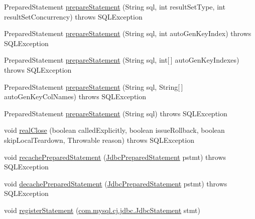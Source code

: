 \begin{DoxyCompactItemize}
\item 
Prepared\+Statement \mbox{\hyperlink{classcom_1_1mysql_1_1cj_1_1jdbc_1_1ha_1_1_multi_host_my_s_q_l_connection_a37f91cfbb410515eae656f2749714a96}{prepare\+Statement}} (String sql, int result\+Set\+Type, int result\+Set\+Concurrency)  throws S\+Q\+L\+Exception 
\item 
Prepared\+Statement \mbox{\hyperlink{classcom_1_1mysql_1_1cj_1_1jdbc_1_1ha_1_1_multi_host_my_s_q_l_connection_a5e08398e0f2ff6b7450f3d2200d250b4}{prepare\+Statement}} (String sql, int auto\+Gen\+Key\+Index)  throws S\+Q\+L\+Exception 
\item 
Prepared\+Statement \mbox{\hyperlink{classcom_1_1mysql_1_1cj_1_1jdbc_1_1ha_1_1_multi_host_my_s_q_l_connection_ae8271152c79bc6964317cf0ed1568e90}{prepare\+Statement}} (String sql, int\mbox{[}$\,$\mbox{]} auto\+Gen\+Key\+Indexes)  throws S\+Q\+L\+Exception 
\item 
Prepared\+Statement \mbox{\hyperlink{classcom_1_1mysql_1_1cj_1_1jdbc_1_1ha_1_1_multi_host_my_s_q_l_connection_a7d26af1cd0ebb70f66bb6e2324f4bd45}{prepare\+Statement}} (String sql, String\mbox{[}$\,$\mbox{]} auto\+Gen\+Key\+Col\+Names)  throws S\+Q\+L\+Exception 
\item 
Prepared\+Statement \mbox{\hyperlink{classcom_1_1mysql_1_1cj_1_1jdbc_1_1ha_1_1_multi_host_my_s_q_l_connection_afa2f8981f698b2b0ba146da7672f890a}{prepare\+Statement}} (String sql)  throws S\+Q\+L\+Exception 
\item 
void \mbox{\hyperlink{classcom_1_1mysql_1_1cj_1_1jdbc_1_1ha_1_1_multi_host_my_s_q_l_connection_adbed19e958ded6aa76e2e1cd5c6e51be}{real\+Close}} (boolean called\+Explicitly, boolean issue\+Rollback, boolean skip\+Local\+Teardown, Throwable reason)  throws S\+Q\+L\+Exception 
\item 
void \mbox{\hyperlink{classcom_1_1mysql_1_1cj_1_1jdbc_1_1ha_1_1_multi_host_my_s_q_l_connection_a861ff794887b4e5d0cd1ae1d2477bd9b}{recache\+Prepared\+Statement}} (\mbox{\hyperlink{interfacecom_1_1mysql_1_1cj_1_1jdbc_1_1_jdbc_prepared_statement}{Jdbc\+Prepared\+Statement}} pstmt)  throws S\+Q\+L\+Exception 
\item 
void \mbox{\hyperlink{classcom_1_1mysql_1_1cj_1_1jdbc_1_1ha_1_1_multi_host_my_s_q_l_connection_aa76a527ef57c07af874082a721628649}{decache\+Prepared\+Statement}} (\mbox{\hyperlink{interfacecom_1_1mysql_1_1cj_1_1jdbc_1_1_jdbc_prepared_statement}{Jdbc\+Prepared\+Statement}} pstmt)  throws S\+Q\+L\+Exception 
\item 
void \mbox{\hyperlink{classcom_1_1mysql_1_1cj_1_1jdbc_1_1ha_1_1_multi_host_my_s_q_l_connection_a1e99a20f35612593a661ee558af5fe4a}{register\+Statement}} (\mbox{\hyperlink{interfacecom_1_1mysql_1_1cj_1_1jdbc_1_1_jdbc_statement}{com.\+mysql.\+cj.\+jdbc.\+Jdbc\+Statement}} stmt)

\end{DoxyCompactItemize}
